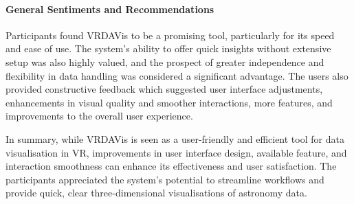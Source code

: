 \paragraph{General Sentiments and Recommendations}
Participants found VRDAVis to be a promising tool, particularly for its speed and ease of use.
The system's ability to offer quick insights without extensive setup was also highly valued, and the prospect of greater independence and flexibility in data handling was considered a significant advantage.
The users also provided constructive feedback which suggested user interface adjustments, enhancements in visual quality and smoother interactions, more features, and improvements to the overall user experience.

In summary, while VRDAVis is seen as a user-friendly and efficient tool for data visualisation in VR, improvements in user interface design, available feature, and interaction smoothness can enhance its effectiveness and user satisfaction. 
The participants appreciated the system's potential to streamline workflows and provide quick, clear three-dimensional visualisations of astronomy data.
